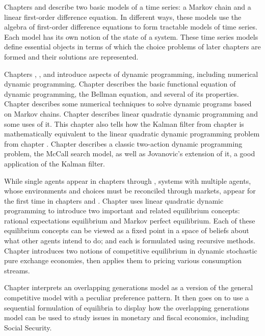 Chapters   and  describe   two basic models of a time series:
a Markov chain and  a linear first-order difference equation.
In different ways, these models use the algebra of first-order
difference equations
to form tractable models of time series.  Each model
has its own notion of the state of a system.  These time
series models define essential   objects in terms of which
the choice problems of later chapters are formed and their
solutions are represented.

  Chapters , , and 
  introduce aspects of dynamic programming, including
numerical dynamic programming. Chapter  describes the
basic functional equation of dynamic programming, the Bellman
equation, and several of its properties. Chapter 
describes some numerical techniques to  solve dynamic programs based
on Markov chains.  Chapter  describes linear
quadratic dynamic programming and some uses  of it. 
This chapter also tells how the Kalman
filter from chapter  is
mathematically equivalent to
\newpage
\noindent the linear quadratic dynamic
programming problem from chapter . Chapter 
describes a classic two-action dynamic programming problem, the
McCall search model, as well as Jovanovic's extension of it, a
good application of  the Kalman filter.


  While single agents appear in   chapters   through
,
systems with multiple agents, whose environments  and choices must
be reconciled through markets,  appear for the first time
in chapters  and .
 Chapter  uses linear quadratic dynamic
programming to introduce two important and related equilibrium concepts:
 rational expectations equilibrium and  Markov perfect
equilibrium.    Each of these equilibrium
concepts can be viewed as a fixed point in a space of beliefs
about what other agents intend to do;  and each    is
formulated using recursive methods.
Chapter  introduces two notions of competitive equilibrium
in dynamic stochastic pure exchange  economies, then applies
them to pricing various  consumption streams.

Chapter   interprets  an overlapping generations model
as a version of the general competitive  model with
a peculiar preference pattern.        It then goes on to
use a sequential formulation of equilibria to display
how the overlapping generations model can be used to study
issues in monetary and fiscal economics, including Social Security.

